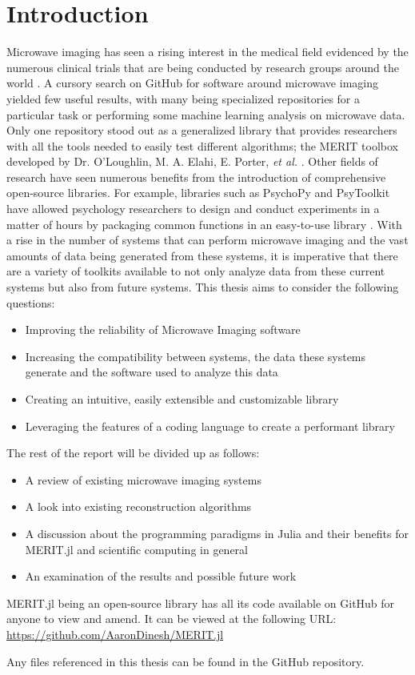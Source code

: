 \chapter*{Introduction}
Microwave imaging has seen a rising interest in the medical field evidenced by the numerous clinical trials that are
being conducted by research groups around the world \cite{preeceMARIAM4Clinical2016, moloneyWaveliaMicrowaveBreast2021,
e.c.fearMicrowaveBreastImaging2013}. A cursory search on GitHub for software around microwave imaging yielded few useful
results, with many being specialized repositories for a particular task or performing some machine learning analysis on
microwave data. Only one repository stood out as a generalized library that provides researchers with all the tools
needed to easily test different algorithms; the MERIT toolbox developed by Dr. O'Loughlin, M. A. Elahi, E. Porter,
\textit{et al.} \cite{d.oloughlinOpensourceSoftwareMicrowave2018}. Other fields of research have seen numerous benefits
from the introduction of comprehensive open-source libraries. For example, libraries such as PsychoPy and PsyToolkit
have allowed psychology researchers to design and conduct experiments in a matter of hours by packaging common functions
in an easy-to-use library \cite{stoetPsyToolkitTestimonials}. With a rise in the number of systems that can perform
microwave imaging and the vast amounts of data being generated from these systems, it is imperative that there are a
variety of toolkits available to not only analyze data from these current systems but also from future systems. This
thesis aims to consider the following questions:
\begin{itemize}
    \item Improving the reliability of Microwave Imaging software
    \item Increasing the compatibility between systems, the data these systems generate and the software used to analyze
    this data
    \item Creating an intuitive, easily extensible and customizable library
    \item Leveraging the features of a coding language to create a performant library   
\end{itemize}
\vspace{1cm}
The rest of the report will be divided up as follows:
\begin{itemize}
    \item A review of existing microwave imaging systems
    \item A look into existing reconstruction algorithms 
    \item A discussion about the programming paradigms in Julia and their benefits for MERIT.jl and scientific computing
    in general
    \item An examination of the results and possible future work
\end{itemize}

MERIT.jl being an open-source library has all its code available on GitHub for anyone to view and amend. It can be
viewed at the following URL: \url{https://github.com/AaronDinesh/MERIT.jl}

Any files referenced in this thesis can be found in the GitHub repository.
